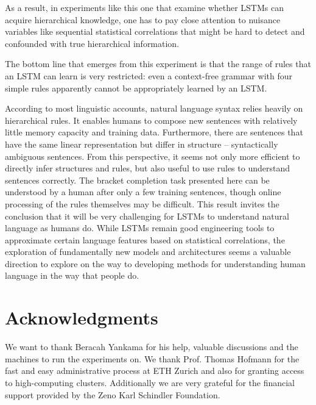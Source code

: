 \documentclass[11pt,a4paper]{article}
\begin{document}
As a result, in experiments like this one that examine whether LSTMs can acquire hierarchical knowledge, one has to pay close attention to nuisance variables like sequential statistical correlations that might be hard to detect and confounded with true hierarchical information.

The bottom line that emerges from this experiment is that the range of rules that an LSTM can learn is very restricted: even a context-free grammar with four simple rules apparently cannot be appropriately learned by an LSTM. 

According to most linguistic accounts, natural language syntax relies heavily on hierarchical rules. It enables humans to compose new sentences with relatively little memory capacity and training data. Furthermore, there are sentences that have the same linear representation but differ in structure -- syntactically ambiguous sentences.  From this perspective, it seems not only more efficient to directly infer structures and rules, but also useful to use rules to understand sentences correctly. The bracket completion task presented here can be understood by a human after only a few training sentences, though online processing of the rules themselves may be difficult. This result invites the conclusion that it will be very challenging for LSTMs to understand natural language as humans do. While LSTMs remain good engineering tools to approximate certain language features based on statistical correlations, the exploration of fundamentally new models and architectures seems a valuable direction to explore on the way to developing methods for understanding human language in the way that people do.

\section*{Acknowledgments}
We want to thank Beracah Yankama for his help, valuable discussions and the machines to run the experiments on. We thank Prof. Thomas Hofmann for the fast and easy administrative process at ETH Zurich and also for granting access to high-computing clusters. Additionally we are very grateful for the financial support provided by the Zeno Karl Schindler Foundation.



\end{document}
